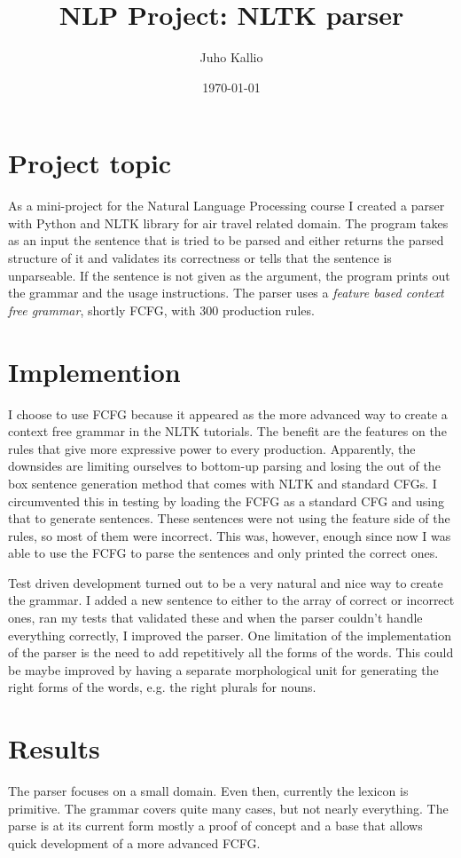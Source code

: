 \documentclass[finnish]{article}
\title{NLP Project: NLTK parser}
\author{Juho Kallio}
\date{\today}
\begin{document}
\maketitle
\section{Project topic}

As a mini-project for the Natural Language Processing course I created a parser with Python and NLTK library for air travel related domain. The program takes as an input the sentence that is tried to be parsed and either returns the parsed structure of it and validates its correctness or tells that the sentence is unparseable. If the sentence is not given as the argument, the program prints out the grammar and the usage instructions. The parser uses a \emph{feature based context free grammar}, shortly FCFG, with 300 production rules.

\section{Implemention}
I choose to use FCFG because it appeared as the more advanced way to create a context free grammar in the NLTK tutorials. The benefit are the features on the rules that give more expressive power to every production. Apparently, the downsides are limiting ourselves to bottom-up parsing and losing the out of the box sentence generation method that comes with NLTK and standard CFGs. I circumvented this in testing by loading the FCFG as a standard CFG and using that to generate sentences. These sentences were not using the feature side of the rules, so most of them were incorrect. This was, however, enough since now I was able to use the FCFG to parse the sentences and only printed the correct ones.

Test driven development turned out to be a very natural and nice way to create the grammar. I added a new sentence to either to the array of correct or incorrect ones, ran my tests that validated these and when the parser couldn't handle everything correctly, I improved the parser. One limitation of the implementation of the parser is the need to add repetitively all the forms of the words. This could be maybe improved by having a separate morphological unit for generating the right forms of the words, e.g. the right plurals for nouns.

\section{Results}
The parser focuses on a small domain. Even then, currently the lexicon is primitive. The grammar covers quite many cases, but not nearly everything. The parse is at its current form mostly a proof of concept and a base that allows quick development of a more advanced FCFG.
\end{document}
